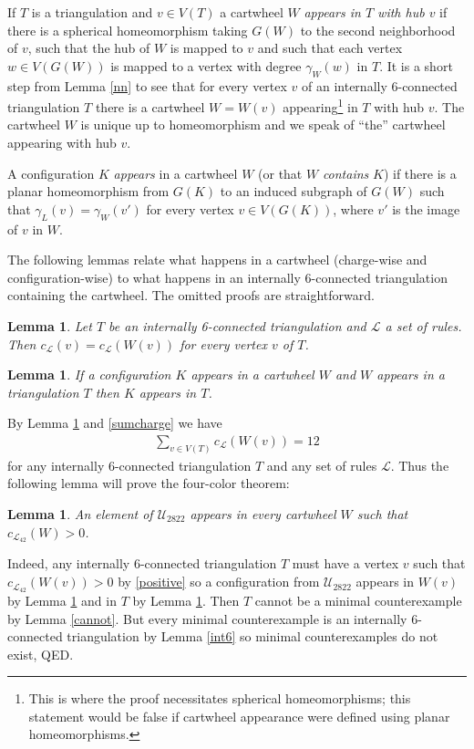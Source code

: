 \documentclass[11pt]{article}
\newtheorem{lemma}[theorem]{Lemma}     %
\newcommand{\eqn}{\begin{eqnarray}}
\newcommand{\uneq}{\end{eqnarray}}
\newcommand{\mcal}{\mathcal}
\newcommand{\ncmath}{2822}
\newcommand{\gm}{\gamma}
\begin{document}
If $T$ is a triangulation and $v \in V(T)$ a cartwheel $W$ \emph{appears in $T$ with hub $v$} if there is a spherical homeomorphism taking $G(W)$ to the second neighborhood of $v$, such that the hub of $W$ is mapped to $v$ and such that each vertex $w \in V(G(W))$ is mapped to a vertex with degree $\gm_W(w)$ in $T$. It is a short step from Lemma \ref{nn} to see that for every vertex $v$ of an internally 6-connected triangulation $T$ there is a cartwheel $W = W(v)$ appearing\footnote{This is where the proof necessitates spherical homeomorphisms; this statement would be false if cartwheel appearance were defined using planar homeomorphisms.} in $T$ with hub $v$. The cartwheel $W$ is unique up to homeomorphism and we speak of ``the'' cartwheel appearing with hub $v$. 

A configuration $K$ \emph{appears} in a cartwheel $W$ (or that $W$ \emph{contains} $K$) if there is a planar homeomorphism from $G(K)$ to an induced subgraph of $G(W)$ such that $\gm_L(v) = \gm_W(v')$ for every vertex $v \in V(G(K))$, where $v'$ is the image of $v$ in $W$.

The following lemmas relate what happens in a cartwheel (charge-wise and configuration-wise) to what happens in an internally 6-connected triangulation containing the cartwheel. The omitted proofs are straightforward.

\begin{lemma}\label{jan}
Let $T$ be an internally 6-connected triangulation and $\mcal{L}$ a set of rules. Then $c_\mcal{L}(v) = c_\mcal{L}(W(v))$ for every vertex $v$ of $T$.
\end{lemma}

\begin{lemma}\label{jon}
If a configuration $K$ appears in a cartwheel $W$ and $W$ appears in a triangulation $T$ then $K$ appears in $T$.
\end{lemma}

\noindent By Lemma \ref{jan} and \eqref{sumcharge} we have
\eqn
\label{positive}
\sum_{v\in V(T)} c_\mcal{L}(W(v)) = 12
\uneq 
for any internally 6-connected triangulation $T$ and any set of rules $\mcal{L}$. Thus 
the following lemma will prove the four-color theorem:

\begin{lemma}\label{appears}
An element of $\mcal{U}_{\ncmath}$ appears in every cartwheel $W$ such that $c_{\mcal{L}_{42}}(W) > 0$.
\end{lemma}

\noindent Indeed, any internally 6-connected triangulation $T$ must have a vertex $v$ such that $c_{\mcal{L}_{42}}(W(v)) > 0$ by \eqref{positive} so a configuration from $\mcal{U}_{\ncmath}$ appears in $W(v)$ by Lemma \ref{appears} and in $T$ by Lemma \ref{jon}. Then $T$ cannot be a minimal counterexample by Lemma \ref{cannot}. But every minimal counterexample 
is an internally 6-connected triangulation by Lemma \ref{int6} so minimal counterexamples do not exist, QED. 
\end{document}
